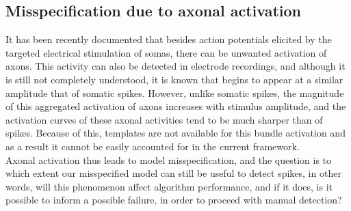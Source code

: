 \documentclass[12pt,letterpaper,fleqn]{article}
\begin{document}
        \subsection{Misspecification due to axonal activation}
 It has been recently documented \cite{Lauren2014} that besides action potentials elicited by the targeted electrical stimulation of somas, there can be unwanted activation of axons. This activity can also be detected in electrode recordings, and although it is still not completely understood, it is known that begins to appear at a similar amplitude that of somatic spikes. However, unlike somatic spikes, the magnitude of this aggregated activation of axons increases with stimulus amplitude, and the activation curves of these axonal activities tend to be much sharper than of spikes. Because of this, templates are not available for this bundle activation and as a result it cannot be easily accounted for in the current framework. 
 \\ Axonal activation thus leads to model misspecification, and the question is to which extent our misspecified model can still be useful to detect spikes, in other words, will this phenomenon affect algorithm performance, and if it does, is it possible to inform a possible failure, in order to proceed with manual detection?\\
\end{document}
